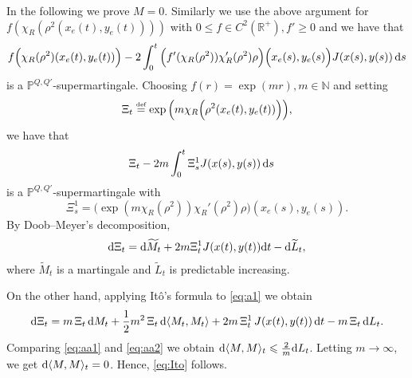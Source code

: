 \documentclass[11pt,UTF-8,reqno]{amsart}
\numberwithin{equation}{section}
\def\<{{\langle}}
\def\>{{\rangle}}
\def\dif{{\mathord{{\rm d}}}}
\newcommand{\eqdef}{\stackrel{\mbox{\tiny def}}{=}}
\def\mN{{\mathbb N}}
\def\mP{{\mathbb P}}
\def\mR{{\mathbb R}}
\def\geq{\geqslant}
\def\leq{\leqslant}
\def\<{{\langle}}
\def\>{{\rangle}}
\def\dif{{\mathord{{\rm d}}}}
\def\geq{\geqslant}
\def\leq{\leqslant}
\def\<{\langle} \def\>{\rangle}
\begin{document}
In the following we prove $M=0$. Similarly we use the above argument for $f(\chi_R(\rho^2(x_e(t),y_e(t))))$ with $0\leq f\in C^2(\mR^+), f'\geq0$ and we have that
\begin{align*}
	f\Big(\chi_R(\rho^2)(x_e(t),y_e(t))\Big)
	-2\int_0^t
	\Big(f'(\chi_R(\rho^2))\chi_R'(\rho^2)\rho\Big)
	\Big(x_e(s),y_e(s)\Big)J(x(s),y(s)) \, \dif s
\end{align*}
is a $\mP^{Q,Q'}$-supermartingale.
Choosing $f(r)=\exp(m r), m\in \mN$ and setting
$$
\Xi_t\eqdef
\exp\Big(m\chi_R\Big(\rho^2(x_e(t),y_e(t))\Big)\Big),
$$ we  have that
\begin{align*}
	\Xi_t&-2m\int_0^t\Xi^1_sJ(x(s),y(s))\,\dif s
\end{align*}
is a $\mP^{Q,Q'}$-supermartingale with $$\Xi_s^1=\Big(\exp(m\chi_R(\rho^2))\chi_R'(\rho^2)\rho\Big)(x_e(s),y_e(s)).$$
By Doob--Meyer's decomposition,
\begin{align}\label{eq:aa1}
	\dif \Xi_t= \dif \widetilde{M}_t+2m\Xi_t^1J(x(t),y(t))\dif t-\dif \widetilde{L}_t,
\end{align}
where $\widetilde{M}_t$ is a martingale and $\widetilde{L}_t$ is predictable increasing.

On the other hand, applying It\^o's formula to \eqref{eq:a1} we obtain
\begin{align}\label{eq:aa2}
	\dif\Xi_t
	=m\,\Xi_t\,\dif M_t
	+\frac12m^2\,\Xi_t \,\dif\<M_t,M_t\>
	+2m\,\Xi_t^1\,J(x(t),y(t))\,\dif t
	-m\,\Xi_t\,\dif L_t.
\end{align}
Comparing \eqref{eq:aa1} and \eqref{eq:aa2} we obtain $\dif\<M,M\>_t\leq \frac2m\dif L_t$. Letting $m\to\infty$, we get $\dif\<M,M\>_t=0$. Hence, \eqref{eq:Ito} follows.




\end{document}
